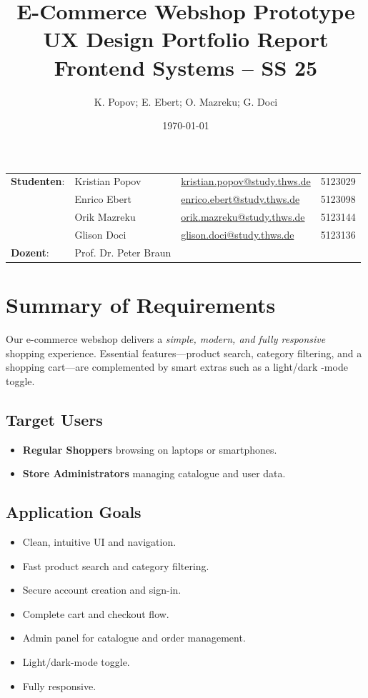 \documentclass[12pt]{article}
\title{
		{\LARGE \textbf{E-Commerce Webshop Prototype
	UX Design Portfolio Report}}\\[5ex]
	{\large Frontend Systems – SS 25}\\[5ex]
}
\author{K. Popov; E. Ebert; O. Mazreku; G. Doci}
\date{\today}
\begin{document}
	\maketitle
	\noindent\begin{tabular}{@{}lllr}
				 \textbf{Studenten}:
				 & Kristian Popov         &\href{mailto:kristian.popov@study.thws.de}{kristian.popov@study.thws.de}           & 5123029
				 \\[2ex]& Enrico Ebert     &\href{mailto:enrico.ebert@study.thws.de}{enrico.ebert@study.thws.de} 			  & 5123098
				 \\[2ex]& Orik Mazreku        &\href{mailto:orik.mazreku@study.thws.de}{orik.mazreku@study.thws.de}           & 5123144
				 \\[2ex]& Glison Doci        &\href{mailto:glison.doci@study.thws.de}{glison.doci@study.thws.de}              & 5123136
				 \\[4ex]\textbf{Dozent}:      & Prof. Dr. Peter Braun
	\end{tabular}
	\newpage

	\tableofcontents
	\newpage

	\section{Summary of Requirements}\label{sec:project-overview}
	Our e-commerce webshop delivers a \emph{simple, modern, and fully responsive} shopping experience. Essential features—product search, category filtering, and a shopping cart—are complemented by smart extras such as a light/dark -mode toggle.
	
	\subsection*{Target Users}
	\begin{itemize}
		\item \textbf{Regular Shoppers} browsing on laptops or smartphones.
		\item \textbf{Store Administrators} managing catalogue and user data.
	\end{itemize}
	
	\subsection*{Application Goals}
	\begin{itemize}
		\item Clean, intuitive UI and navigation.
		\item Fast product search and category filtering.
		\item Secure account creation and sign-in.
		\item Complete cart and checkout flow.
		\item Admin panel for catalogue and order management.
		\item Light/dark-mode toggle.
		\item Fully responsive.
	\end{itemize}
\end{document}
